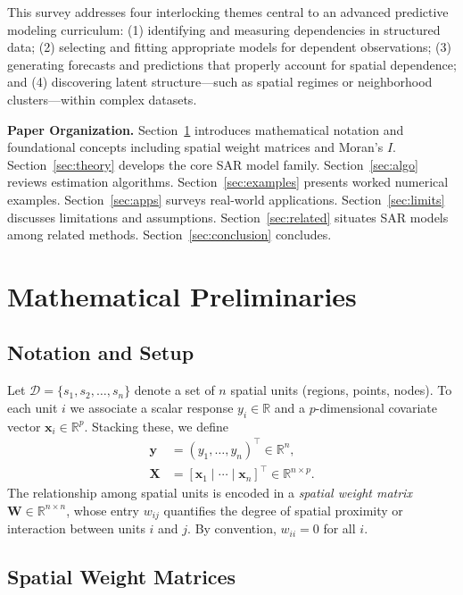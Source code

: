 \documentclass[conference]{IEEEtran}
\theoremstyle{definition}
\begin{document}
This survey addresses four interlocking themes central to an advanced predictive modeling curriculum: (1) identifying and measuring dependencies in structured data; (2) selecting and fitting appropriate models for dependent observations; (3) generating forecasts and predictions that properly account for spatial dependence; and (4) discovering latent structure---such as spatial regimes or neighborhood clusters---within complex datasets.

\textbf{Paper Organization.} Section~\ref{sec:prelim} introduces mathematical notation and foundational concepts including spatial weight matrices and Moran's $I$. Section~\ref{sec:theory} develops the core SAR model family. Section~\ref{sec:algo} reviews estimation algorithms. Section~\ref{sec:examples} presents worked numerical examples. Section~\ref{sec:apps} surveys real-world applications. Section~\ref{sec:limits} discusses limitations and assumptions. Section~\ref{sec:related} situates SAR models among related methods. Section~\ref{sec:conclusion} concludes.

\section{Mathematical Preliminaries}
\label{sec:prelim}

\subsection{Notation and Setup}

Let $\mathcal{D} = \{s_1, s_2, \ldots, s_n\}$ denote a set of $n$ spatial units (regions, points, nodes). To each unit $i$ we associate a scalar response $y_i \in \mathbb{R}$ and a $p$-dimensional covariate vector $\mathbf{x}_i \in \mathbb{R}^p$. Stacking these, we define
\begin{align}
\mathbf{y} &= (y_1, \ldots, y_n)^\top \in \mathbb{R}^n, \\
\mathbf{X} &= [\mathbf{x}_1 \mid \cdots \mid \mathbf{x}_n]^\top \in \mathbb{R}^{n \times p}.
\end{align}
The relationship among spatial units is encoded in a \emph{spatial weight matrix} $\mathbf{W} \in \mathbb{R}^{n \times n}$, whose entry $w_{ij}$ quantifies the degree of spatial proximity or interaction between units $i$ and $j$. By convention, $w_{ii} = 0$ for all $i$.

\subsection{Spatial Weight Matrices}
\end{document}
